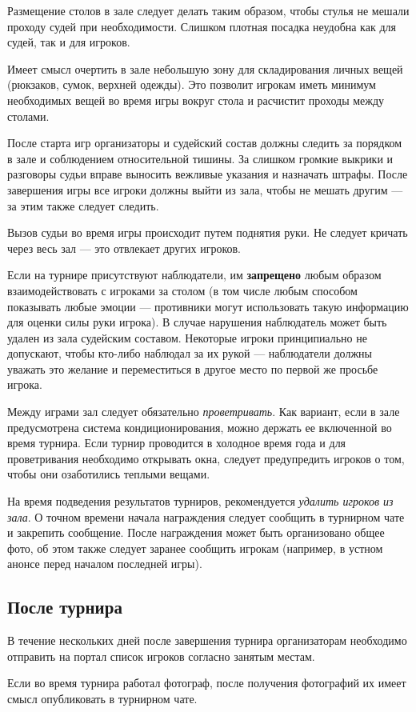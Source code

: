 Размещение столов в зале следует делать таким образом, чтобы стулья не мешали проходу судей при необходимости. Слишком плотная посадка неудобна как для судей, так и для игроков.

Имеет смысл очертить в зале небольшую зону для складирования личных вещей (рюкзаков, сумок, верхней одежды). Это позволит игрокам иметь минимум необходимых вещей во время игры вокруг стола и расчистит проходы между столами.

После старта игр организаторы и судейский состав должны следить за порядком в зале и соблюдением относительной тишины. За слишком громкие выкрики и разговоры судьи вправе выносить вежливые указания и назначать штрафы. После завершения игры все игроки должны выйти из зала, чтобы не мешать другим --- за этим также следует следить.

Вызов судьи во время игры происходит путем поднятия руки. Не следует кричать через весь зал --- это отвлекает других игроков.

Если на турнире присутствуют наблюдатели, им \textbf{запрещено} любым образом взаимодействовать с игроками за столом (в том числе любым способом показывать любые эмоции --- противники могут использовать такую информацию для оценки силы руки игрока). В случае нарушения наблюдатель может быть удален из зала судейским составом. Некоторые игроки принципиально не допускают, чтобы кто-либо наблюдал за их рукой --- наблюдатели должны уважать это желание и переместиться в другое место по первой же просьбе игрока.

Между играми зал следует обязательно \textit{проветривать}. Как вариант, если в зале предусмотрена система кондиционирования, можно держать ее включенной во время турнира. Если турнир проводится в холодное время года и для проветривания необходимо открывать окна, следует предупредить игроков о том, чтобы они озаботились теплыми вещами.

На время подведения результатов турниров, рекомендуется \textit{удалить игроков из зала}. О точном времени начала награждения следует сообщить в турнирном чате и закрепить сообщение. После награждения может быть организовано общее фото, об этом также следует заранее сообщить игрокам (например, в устном анонсе перед началом последней игры).

\subsection{После турнира}

В течение нескольких дней после завершения турнира организаторам необходимо отправить на портал список игроков согласно занятым местам. 

Если во время турнира работал фотограф, после получения фотографий их имеет смысл опубликовать в турнирном чате.
